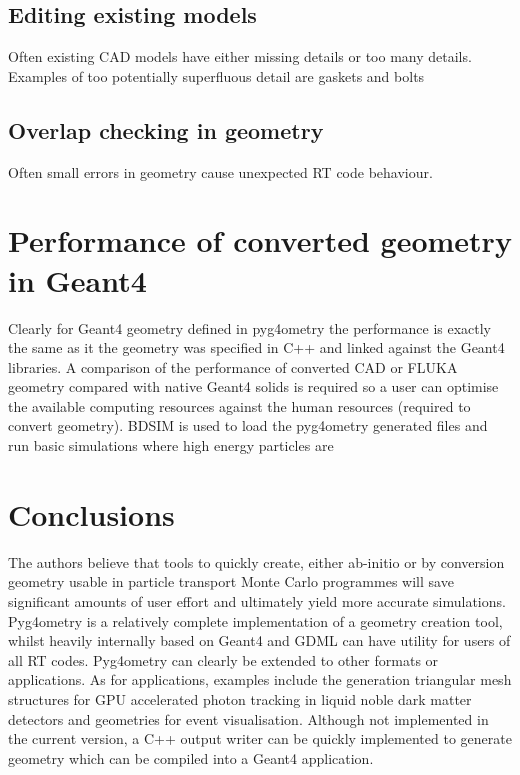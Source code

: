 \documentclass[final,5p,times,twocolumn]{elsarticle}
\begin{document}
\subsection{Editing existing models}
Often existing CAD models have either missing details or too many details. Examples of too potentially superfluous detail are gaskets and bolts 

\subsection{Overlap checking in geometry}
Often small errors in geometry cause unexpected RT code behaviour.  

\section{Performance of converted geometry in Geant4}
Clearly for Geant4 geometry defined in pyg4ometry the performance is exactly the same as it the geometry was specified in C++ and linked against the Geant4
libraries. A comparison of the performance of converted CAD or FLUKA geometry compared with native Geant4 solids is required so a user can optimise the available
computing resources against the human resources (required to convert geometry). BDSIM is used to load the pyg4ometry generated files  and run basic simulations where 
high energy particles are   

\section{Conclusions}
The authors believe that tools to quickly create, either ab-initio or by conversion geometry usable in particle transport Monte Carlo programmes will save significant 
amounts of user effort and ultimately yield more accurate simulations. Pyg4ometry is a relatively complete implementation of a geometry creation tool, whilst heavily 
internally based on Geant4 and GDML can have utility for users of all RT codes. Pyg4ometry can clearly be extended to other formats or applications. As for applications,
examples include  the  generation triangular mesh structures for GPU accelerated photon tracking in liquid noble  dark matter detectors and geometries for event visualisation. 
Although not implemented in the current version, a C++ output writer can be quickly implemented to generate geometry which can be compiled into a Geant4 application. 

\end{document}
